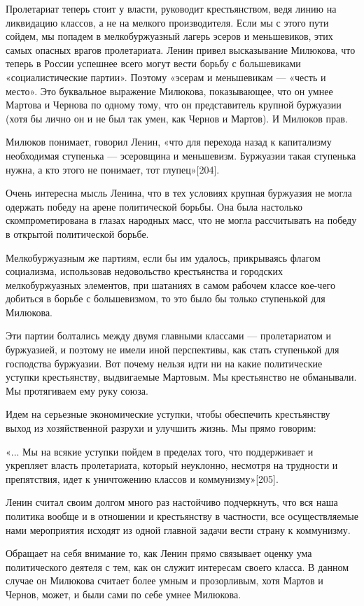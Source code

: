 \documentclass[12pt, a4paper, openany]{book}
\begin{document}
Пролетариат теперь стоит у власти, руководит крестьянством, ведя линию на ликвидацию классов, а не на мелкого производителя. Если мы с этого пути сойдем, мы попадем в мелкобуржуазный лагерь эсеров и меньшевиков, этих самых опасных врагов пролетариата. Ленин привел высказывание Милюкова, что теперь в России успешнее всего могут вести борьбу с большевиками «социалистические партии». Поэтому «эсерам и меньшевикам — «честь и место». Это буквальное выражение Милюкова, показывающее, что он умнее Мартова и Чернова по одному тому, что он представитель крупной буржуазии (хотя бы лично он и не был так умен, как Чернов и Мартов). И Милюков прав.

Милюков понимает, говорил Ленин, «что для перехода назад к капитализму необходимая ступенька — эсеровщина и меньшевизм. Буржуазии такая ступенька нужна, а кто этого не понимает, тот глупец»[204].

Очень интересна мысль Ленина, что в тех условиях крупная буржуазия не могла одержать победу на арене политической борьбы. Она была настолько скомпрометирована в глазах народных масс, что не могла рассчитывать на победу в открытой политической борьбе.

Мелкобуржуазным же партиям, если бы им удалось, прикрываясь флагом социализма, использовав недовольство крестьянства и городских мелкобуржуазных элементов, при шатаниях в самом рабочем классе кое-чего добиться в борьбе с большевизмом, то это было бы только ступенькой для Милюкова.

Эти партии болтались между двумя главными классами — пролетариатом и буржуазией, и поэтому не имели иной перспективы, как стать ступенькой для господства буржуазии. Вот почему нельзя идти ни на какие политические уступки крестьянству, выдвигаемые Мартовым. Мы крестьянство не обманывали. Мы протягиваем ему руку союза.

Идем на серьезные экономические уступки, чтобы обеспечить крестьянству выход из хозяйственной разрухи и улучшить жизнь. Мы прямо говорим:

«... Мы на всякие уступки пойдем в пределах того, что поддерживает и укрепляет власть пролетариата, который неуклонно, несмотря на трудности и препятствия, идет к уничтожению классов и коммунизму»[205].

Ленин считал своим долгом много раз настойчиво подчеркнуть, что вся наша политика вообще и в отношении и крестьянству в частности, все осуществляемые нами мероприятия исходят из одной главной задачи вести страну к коммунизму.

Обращает на себя внимание то, как Ленин прямо связывает оценку ума политического деятеля с тем, как он служит интересам своего класса. В данном случае он Милюкова считает более умным и прозорливым, хотя Мартов и Чернов, может, и были сами по себе умнее Милюкова.
\end{document}
